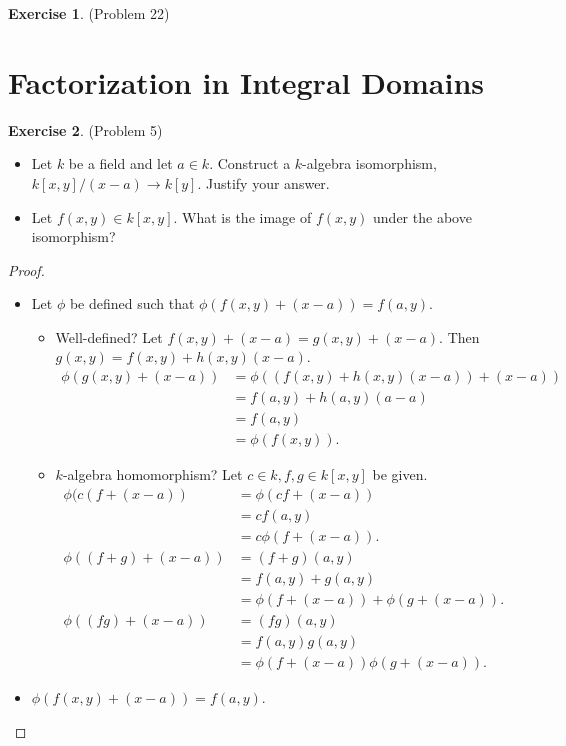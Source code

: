 \documentclass[12pt, psamsfonts]{amsart}
\theoremstyle{definition}
\newtheorem*{exer}{Exercise}
\theoremstyle{remark}
\numberwithin{equation}{section}
\begin{document}
\begin{exer}{(Problem 22)}
  \todo[inline]{
  }
\end{exer}

\section{Factorization in Integral Domains}

\begin{exer}{(Problem 5)}
  $ $
  \begin{itemize}
    \item
      Let $k$ be a field and let $a \in k$.
      Construct a $k$-algebra isomorphism, $k[x, y] / (x - a) \rightarrow k[y]$.
      Justify your answer.
    \item
      Let $f(x, y) \in k[x, y]$.
      What is the image of $f(x, y)$ under the above isomorphism?
  \end{itemize}
\end{exer}

\begin{proof}
  $ $
  \begin{itemize}
    \item
      Let $\phi$ be defined such that $\phi(f(x, y) + (x - a)) = f(a, y)$.
      \begin{itemize}
        \item
          Well-defined?
          Let $f(x, y) + (x - a) = g(x, y) + (x - a)$.
          Then $g(x, y) = f(x, y) + h(x, y)(x - a)$.
          \begin{align*}
            \phi(g(x, y) + (x - a))
              &= \phi((f(x, y) + h(x, y)(x - a)) + (x - a)) \\
              &= f(a, y) + h(a, y)(a - a) \\
              &= f(a, y) \\
              &= \phi(f(x, y)).
          \end{align*}
        \item
          $k$-algebra homomorphism?
          Let $c \in k, f, g \in k[x, y]$ be given.
          \begin{align*}
            \phi(c(f + (x - a))
              &= \phi(cf + (x - a)) \\
              &= cf(a, y) \\
              &= c\phi(f + (x - a)). \\
            \phi((f + g) + (x - a))
              &= (f + g)(a, y) \\
              &= f(a, y) + g(a, y) \\
              &= \phi(f + (x - a)) + \phi(g + (x - a)). \\
            \phi((fg) + (x - a))
              &= (fg)(a, y) \\
              &= f(a, y)g(a, y) \\
              &= \phi(f + (x - a))\phi(g + (x - a)).
          \end{align*}
      \end{itemize}
    \item
      $\phi(f(x, y) + (x - a)) = f(a, y)$.
  \end{itemize}
\end{proof}
\end{document}
